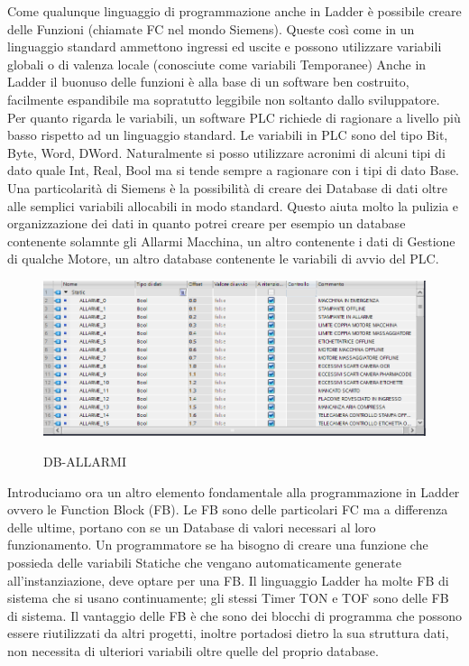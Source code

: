 \documentclass[12pt, a4paper, oneside]{book}
\begin{document}
	
	Come qualunque linguaggio di programmazione anche in Ladder è possibile creare delle Funzioni (chiamate FC nel mondo Siemens). Queste così come in un linguaggio standard ammettono ingressi ed uscite e possono utilizzare variabili globali o di valenza locale (conosciute come variabili Temporanee) Anche in Ladder il buonuso delle funzioni è alla base di un software ben costruito, facilmente espandibile ma sopratutto leggibile non soltanto dallo sviluppatore. Per quanto rigarda le variabili, un software PLC richiede di ragionare a livello più basso rispetto ad un linguaggio standard. Le variabili in PLC sono del tipo Bit, Byte, Word, DWord. Naturalmente si posso utilizzare acronimi di alcuni tipi di dato quale Int, Real, Bool ma si tende sempre a ragionare con i tipi di dato Base. 
	Una particolarità di Siemens è la possibilità di creare dei Database di dati oltre alle semplici variabili allocabili in modo standard. Questo aiuta molto la pulizia e organizzazione dei dati in quanto potrei creare per esempio un database contenente solamnte gli Allarmi Macchina, un altro contenente i dati di Gestione di qualche Motore, un altro database contenente le variabili di avvio del PLC. 
	
	\begin{figure}[H]
	\centering
	\includegraphics[width=12cm]{Immagini/LAD4}
	\label{lad4}
	\caption{DB-ALLARMI}
	\end{figure}

	Introduciamo ora un altro elemento fondamentale alla programmazione in Ladder ovvero le Function Block (FB). Le FB sono delle particolari FC ma a differenza delle ultime, portano con se un Database di valori necessari al loro funzionamento. Un programmatore se ha bisogno di creare una funzione che possieda delle variabili Statiche che vengano automaticamente generate all'instanziazione, deve optare per una FB. Il linguaggio Ladder ha molte FB di sistema che si usano continuamente; gli stessi Timer TON e TOF sono delle FB di sistema. Il vantaggio delle FB è che sono dei blocchi di programma che possono essere riutilizzati da altri progetti, inoltre portadosi dietro la sua struttura dati, non necessita di ulteriori variabili oltre quelle del proprio database.
\end{document}

